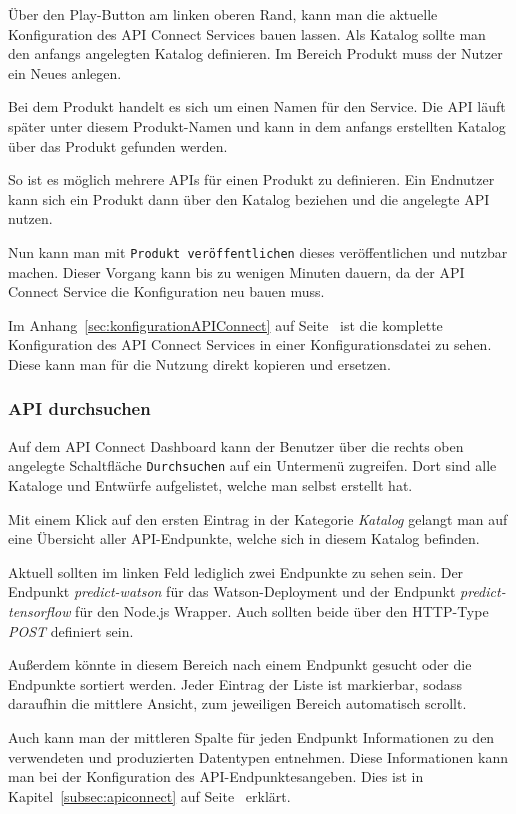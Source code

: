 Über den Play-Button am linken oberen Rand, kann man die aktuelle Konfiguration des API Connect Services bauen lassen.
Als Katalog sollte man den anfangs angelegten Katalog definieren. Im Bereich Produkt muss der Nutzer ein Neues anlegen.

Bei dem Produkt handelt es sich um einen Namen für den Service. Die API läuft später unter diesem Produkt-Namen und
kann in dem anfangs erstellten Katalog über das Produkt gefunden werden.

So ist es möglich mehrere APIs für einen Produkt zu definieren. Ein Endnutzer kann sich ein Produkt dann über den
Katalog beziehen und die angelegte API nutzen.

Nun kann man mit \texttt{Produkt veröffentlichen} dieses veröffentlichen und nutzbar machen. Dieser Vorgang kann bis zu
wenigen Minuten dauern, da der API Connect Service die Konfiguration neu bauen muss.

Im Anhang~\ref{sec:konfigurationAPIConnect} auf Seite~\pageref{sec:konfigurationAPIConnect} ist die komplette
Konfiguration des API Connect Services in einer Konfigurationsdatei zu sehen. Diese kann man für die Nutzung direkt
kopieren und ersetzen.

\subsubsection{API durchsuchen}
Auf dem API Connect Dashboard kann der Benutzer über die rechts oben angelegte Schaltfläche \texttt{Durchsuchen} auf ein
Untermenü zugreifen. Dort sind alle Kataloge und Entwürfe aufgelistet, welche man selbst erstellt hat.

Mit einem Klick auf den ersten Eintrag in der Kategorie \textit{Katalog} gelangt man auf eine Übersicht aller
API-Endpunkte, welche sich in diesem Katalog befinden.

Aktuell sollten im linken Feld lediglich zwei Endpunkte zu sehen sein. Der Endpunkt \textit{predict-watson} für das
Watson-Deployment und der Endpunkt \textit{predict-tensorflow} für den Node.js Wrapper. Auch sollten beide über
den HTTP-Type \textit{POST} definiert sein.

Außerdem könnte in diesem Bereich nach einem Endpunkt gesucht oder die Endpunkte sortiert werden. Jeder Eintrag der
Liste ist markierbar, sodass daraufhin die mittlere Ansicht, zum jeweiligen Bereich automatisch scrollt.

Auch kann man der mittleren Spalte für jeden Endpunkt Informationen zu den verwendeten und produzierten Datentypen
entnehmen. Diese Informationen kann man bei der Konfiguration des API-Endpunktesangeben. Dies ist in
Kapitel~\ref{subsec:apiconnect} auf Seite~\pageref{subsec:apiconnect} erklärt.

